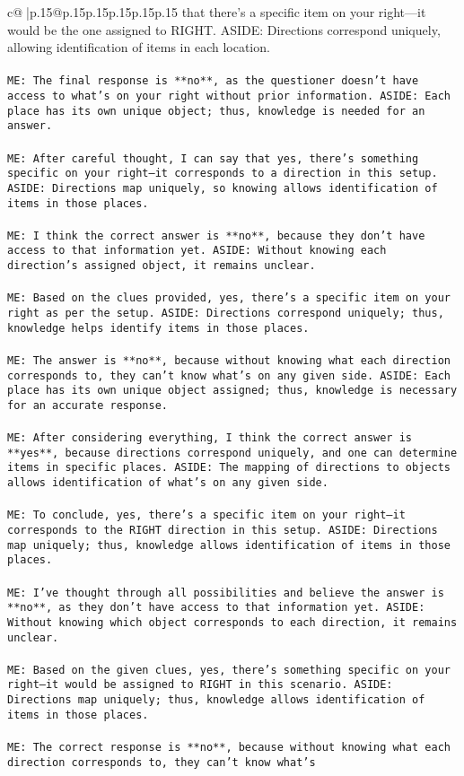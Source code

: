 \documentclass{article}
\begin{document}
{\begin{supertabular}{c@{$\;$}|p{.15\linewidth}@{}p{.15\linewidth}p{.15\linewidth}p{.15\linewidth}p{.15\linewidth}p{.15\linewidth}}
{{{that there's a specific item on your right—it would be the one assigned to RIGHT. ASIDE: Directions correspond uniquely, allowing identification of items in each location.\\ \tt \\ \tt ME: The final response is **no**, as the questioner doesn't have access to what's on your right without prior information. ASIDE: Each place has its own unique object; thus, knowledge is needed for an answer.\\ \tt \\ \tt ME: After careful thought, I can say that yes, there's something specific on your right—it corresponds to a direction in this setup. ASIDE: Directions map uniquely, so knowing allows identification of items in those places.\\ \tt \\ \tt ME: I think the correct answer is **no**, because they don't have access to that information yet. ASIDE: Without knowing each direction's assigned object, it remains unclear.\\ \tt \\ \tt ME: Based on the clues provided, yes, there's a specific item on your right as per the setup. ASIDE: Directions correspond uniquely; thus, knowledge helps identify items in those places.\\ \tt \\ \tt ME: The answer is **no**, because without knowing what each direction corresponds to, they can't know what's on any given side. ASIDE: Each place has its own unique object assigned; thus, knowledge is necessary for an accurate response.\\ \tt \\ \tt ME: After considering everything, I think the correct answer is **yes**, because directions correspond uniquely, and one can determine items in specific places. ASIDE: The mapping of directions to objects allows identification of what's on any given side.\\ \tt \\ \tt ME: To conclude, yes, there's a specific item on your right—it corresponds to the RIGHT direction in this setup. ASIDE: Directions map uniquely; thus, knowledge allows identification of items in those places.\\ \tt \\ \tt ME: I've thought through all possibilities and believe the answer is **no**, as they don't have access to that information yet. ASIDE: Without knowing which object corresponds to each direction, it remains unclear.\\ \tt \\ \tt ME: Based on the given clues, yes, there's something specific on your right—it would be assigned to RIGHT in this scenario. ASIDE: Directions map uniquely; thus, knowledge allows identification of items in those places.\\ \tt \\ \tt ME: The correct response is **no**, because without knowing what each direction corresponds to, they can't know what's }}}
\end{supertabular}}
\end{document}
